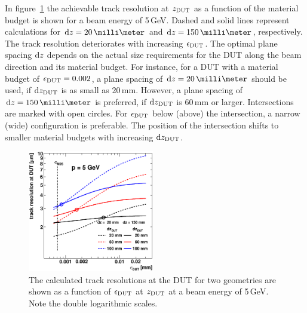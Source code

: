 In figure~\ref{fig:CalcResoP_DUT} the achievable track resolution at $z_{\textrm{DUT}}$ as a function of the material budget is shown for a beam energy of 5\,GeV.
Dashed and solid lines represent calculations for $\dz = 20\,\milli\meter$ and $\dz = 150\,\milli\meter$, respectively. 
The track resolution deteriorates with increasing $\mathnormal{\epsilon_{\textrm{DUT}}}$. 
The optimal plane spacing $\textrm{d}z$ depends on the actual size requirements for the DUT along the beam direction and its material budget.
For instance, for a DUT with a material budget of $\mathnormal{\epsilon_{\textrm{DUT}}} = 0.002$, a plane spacing of $\dz = 20\,\milli\meter$ should be used, if $\textrm{d}z_{\textrm{DUT}}$ is as small as 20\,mm. 
However, a plane spacing of $\dz = 150\,\milli\meter$ is preferred, if $\textrm{d}z_{\textrm{DUT}}$ is 60\,mm or larger. 
Intersections are marked with open circles. 
For $\mathnormal{\epsilon_{\textrm{DUT}}}$ below (above) the intersection, a narrow (wide) configuration is preferable. 
The position of the intersection shifts to smaller material budgets with increasing $\textrm{d}z_{\textrm{DUT}}$. 

\begin{figure}[tbp]
  \centering
  \includegraphics[width=0.49\textwidth]{figures/trackres_vs_epsdut_DESY} %
   \caption[Track resolution as a function of the beam energy]{
   The calculated track resolutions at the DUT for two geometries are shown as a function of $\mathnormal{\epsilon_{\textrm{DUT}}}$ at $z_{\textrm{DUT}}$ at a beam energy of 5\,GeV. 
   Note the double logarithmic scales. 
   }
 \label{fig:CalcResoP_DUT}
\end{figure}

